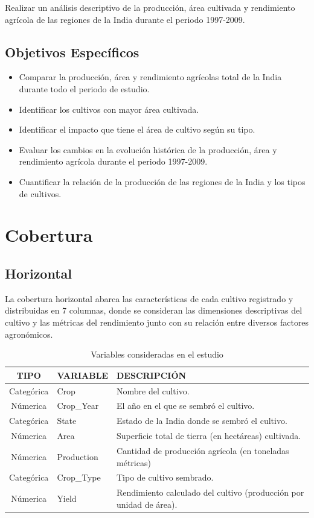 \documentclass[oneside,11pt]{Latex/Classes/PhDthesisPSnPDF}
\begin{document}
Realizar un análisis descriptivo de la producción, área cultivada y
rendimiento agrícola de las regiones de la India durante el periodo
1997-2009.

\subsection{Objetivos Específicos}

\begin{itemize}
  \item{Comparar la producción, área y rendimiento agrícolas total de la India durante todo el periodo de estudio.}
  \item{ Identificar los cultivos con mayor área cultivada.}
  \item{Identificar el impacto que tiene el área de cultivo según su tipo.}
  \item{Evaluar los cambios en la evolución histórica de la producción, área y rendimiento agrícola durante el periodo 1997-2009.}
  \item{Cuantificar la relación de la producción de las regiones de la India y los tipos de cultivos.}
\end{itemize}

\section{Cobertura}

\subsection{Horizontal}

La cobertura horizontal abarca las características de cada cultivo
registrado y distribuidas en 7 columnas, donde se consideran las
dimensiones descriptivas del cultivo y las métricas del rendimiento
junto con su relación entre diversos factores agronómicos.\\

\begin{table}[ht] %
\centering
\caption{Variables consideradas en el estudio} 
\resizebox{12cm}{!} {
\begin{tabular}{cll}
  \hline
  \textbf{TIPO} & \textbf{VARIABLE} & \textbf{DESCRIPCIÓN} \\ 
  \hline
  Categórica & Crop & Nombre del cultivo. \\ 
  Númerica & Crop\_Year & El año en el que se sembró el cultivo. \\ 
  Categórica & State & Estado de la India donde se sembró el cultivo. \\ 
  Númerica & Area & Superficie total de tierra (en hectáreas) cultivada. \\ 
  Númerica & Production & Cantidad de producción agrícola (en toneladas métricas) \\ 
  Categórica & Crop\_Type & Tipo de cultivo sembrado. \\ 
  Númerica & Yield & Rendimiento calculado del cultivo (producción por unidad de área). \\ 
   \hline
\end{tabular}
}
\end{table}
\end{document}
